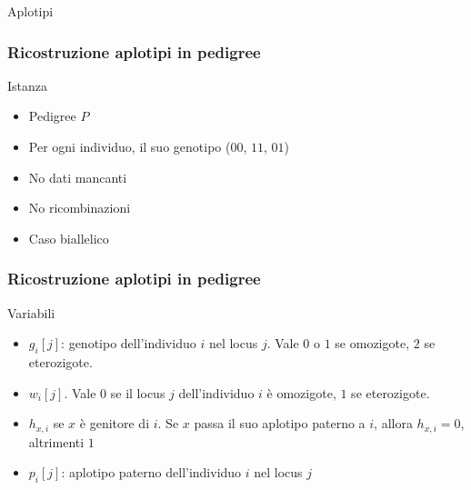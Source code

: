 


\begin{frame}
  \titlepage

  \centering
  Aplotipi
\end{frame}

\begin{frame}
\frametitle{Ricostruzione aplotipi in pedigree}

\begin{block}{Istanza}
\begin{itemize}
\item
Pedigree $P$
\item
Per ogni individuo, il suo genotipo ($00$, $11$, $01$)
\item
No dati mancanti
\item
No ricombinazioni
\item
Caso biallelico
\end{itemize}
\end{block}
\end{frame}


\begin{frame}
\frametitle{Ricostruzione aplotipi in pedigree}
\begin{block}{Variabili}
\begin{itemize}
\item
$g_{i}[j]$: genotipo dell'individuo $i$ nel locus $j$.
Vale $0$ o $1$ se omozigote, $2$ se eterozigote.
\item
$w_{i}[j]$.
Vale $0$  se il locus $j$ dell'individuo $i$ è omozigote, $1$ se eterozigote.
\item
$h_{x,i}$ se $x$ è genitore di $i$.
Se $x$ passa il suo aplotipo paterno a $i$, allora $h_{x,i}=0$, altrimenti $1$
\item
$p_{i}[j]$: aplotipo paterno dell'individuo $i$ nel locus $j$
\end{itemize}
\end{block}
\end{frame}


